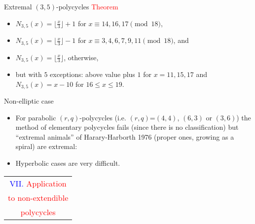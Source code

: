 \documentclass[%
pdf,
colorBG,
slideColor,
]{prosper}
\begin{document}
\begin{slide}{Extremal $(3,5)$-polycycles}
\textcolor{red}{Theorem}
\begin{itemize}
\item $N_{3,5}(x)= \lfloor \frac{x}{3} \rfloor +1$ for $x\equiv 14,16,17 \pmod {18}$,
\item $N_{3,5}(x)= \lfloor \frac{x}{3} \rfloor -1$ for $x\equiv 3,4,6,7,9,11 \pmod {18}$, and
\item $N_{3,5}(x)= \lfloor \frac{x}{3} \rfloor$, otherwise,
\item but with $5$ exceptions: above value plus $1$ for $x=11,15,17$
and $N_{3,5}(x)=x-10$ for $16 \le x \le 19$.
\end{itemize}
\end{slide}






\begin{slide}{Non-elliptic case}
\begin{itemize}
\item For parabolic $(r,q)$-polycycles (i.e. $(r,q)$=$(4,4)$, $(6,3)$ or $(3,6)$) the method of elementary polycycles fails (since there is no classification) but ``extremal animals'' of Harary-Harborth 1976 (proper ones, growing as a spiral) are extremal:
\begin{center}
\par
\end{center}
\item Hyperbolic cases are very difficult.
\end{itemize}
\end{slide}







\begin{slide}{}
\begin{center}
{\Huge 
\begin{tabular*}{8cm}{c}
\\[-0.5cm]
\textcolor{blue}{VII. }\textcolor{red}{Application}\\
\textcolor{red}{to non-extendible}\\
\textcolor{red}{polycycles}
\end{tabular*}
}
\end{center}
\end{slide}
\end{document}

